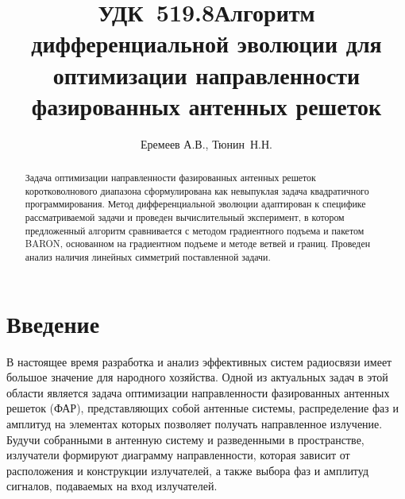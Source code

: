 \documentclass{llncs}
\begin{document}
\mainmatter              %
%
\title{\hbox{\normalsize УДК 519.8}Алгоритм дифференциальной эволюции для оптимизации направленности фазированных антенных решеток}
%
\titlerunning{ }  %
%
\author{Еремеев А.В., Тюнин~Н.Н.}
%
%
%

\maketitle              %

\begin{abstract}
Задача оптимизации направленности фазированных антенных решеток коротковолнового диапазона сформулирована как невыпуклая задача квадратичного программирования. 
Метод дифференциальной эволюции адаптирован к специфике рассматриваемой задачи и проведен вычислительный эксперимент, в котором предложенный алгоритм сравнивается с методом градиентного подъема и пакетом BARON, основанном на градиентном подъеме и методе ветвей и границ. Проведен анализ наличия линейных симметрий поставленной задачи.

\end{abstract}

\thispagestyle{empty}
\section*{Введение}
В настоящее время разработка и анализ эффективных систем радиосвязи имеет большое значение для народного хозяйства. Одной из актуальных задач в этой области является задача оптимизации направленности фазированных антенных решеток (ФАР), представляющих собой антенные системы, распределение фаз и амплитуд на элементах которых позволяет получать направленное излучение.
Будучи собранными в антенную систему и разведенными в пространстве, излучатели формируют диаграмму направленности, которая зависит от расположения и конструкции излучателей, а также выбора фаз и амплитуд сигналов, подаваемых на вход излучателей.
\end{document}
